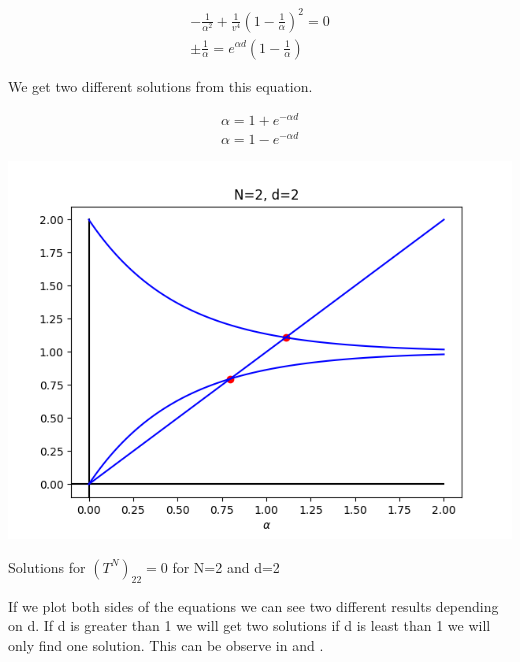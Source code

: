 \begin{equation}
  \label{5.13}
  \begin{array}{c}
    -\frac{1}{\alpha^2} + \frac{1}{v^4}(1-\frac{1}{\alpha})^2 = 0 \\
    \pm \frac{1}{\alpha} = e^{\alpha d}(1-\frac{1}{\alpha})
  \end{array}
\end{equation}

We get two different solutions from this equation.

\begin{equation}
  \label{5.14}
  \begin{array}{c}
    \alpha = 1 + e^{-\alpha d}

    \\

    \alpha = 1 - e^{-\alpha d}
  \end{array}
\end{equation}

\begin{marginfigure}
  \includegraphics{images5/N=2,d=2.png}
  \centering
  \caption{Solutions for $(T^N)_{22} = 0$ for N=2 and d=2}
\end{marginfigure}

If we plot both sides of the equations we can see two different results depending on d. If d is greater than 1 we will get two solutions if d is least than 1 we will only find one solution. This can be observe in  and . 

